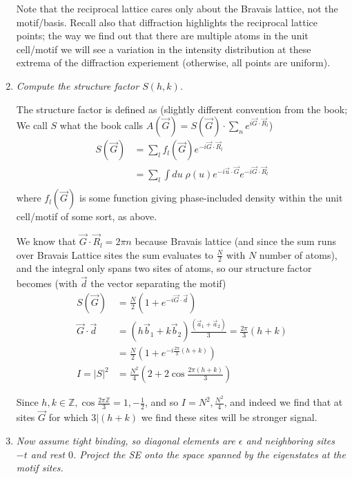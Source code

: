 \documentclass[10pt]{report}
\newcommand{\abs}[1]{\left|#1\right|}
\begin{document}
\begin{enumerate}[1.]
        Note that the reciprocal lattice cares only about the Bravais lattice, not the motif/basis. Recall also that diffraction highlights the reciprocal lattice points; the way we find out that there are multiple atoms in the unit cell/motif we will see a variation in the intensity distribution at these extrema of the diffraction experiement (otherwise, all points are uniform). 

    \item \emph{Compute the structure factor $S(h,k)$.}

        The structure factor is defined as (slightly different convention from the book; We call $S$ what the book calls $A(\vec{G}) = S(\vec{G}) \cdot \sum\limits_{n}^{}e^{i\vec{G} \cdot \vec{R}_l}$)
        \begin{align}
            S(\vec{G}) &= \sum\limits_{l}^{}f_l(\vec{G}) e^{-i\vec{G}\cdot \vec{R}_l}\\
            &= \sum\limits_{l}^{}\int\limits_{}^{}du\;\rho(u)e^{-i\vec{u} \cdot \vec{G}}e^{-i\vec{G} \cdot \vec{R}_l}
        \end{align}
        where $f_l(\vec{G})$ is some function giving phase-included density within the unit cell/motif of some sort, as above.

        We know that $\vec{G} \cdot \vec{R}_l = 2\pi n$ because Bravais lattice (and since the sum runs over Bravais Lattice sites the sum evaluates to $\frac{N}{2}$ with $N$ number of atoms), and the integral only spans two sites of atoms, so our structure factor becomes (with $\vec{d}$ the vector separating the motif)
        \begin{align}
            S(\vec{G}) &= \frac{N}{2}\left( 1 + e^{-i \vec{G} \cdot \vec{d}} \right)\\
            \vec{G} \cdot \vec{d} &= \left( h\vec{b}_1 + k\vec{b}_2 \right) \frac{\left( \vec{a}_1 + \vec{a}_2 \right)}{3} = \frac{2\pi}{3}\left( h + k \right)\\
            &= \frac{N}{2}\left( 1 + e^{-i\frac{2\pi}{3}\left( h + k \right)} \right)\\
            I = \abs{S}^2 &= \frac{N^2}{4}\left( 2 + 2\cos \frac{2\pi(h+k)}{3} \right)
        \end{align}

        Since $h,k\in\mathbb{Z}, \cos \frac{2\pi \mathbb{Z}}{3} = 1,-\frac{1}{2}$, and so $I = N^2, \frac{N^2}{4}$, and indeed we find that at sites $\vec{G}$ for which $3 | (h+k)$ we find these sites will be stronger signal.

    \item \emph{Now assume tight binding, so diagonal elements are $\epsilon$ and neighboring sites $-t$ and rest $0$. Project the SE onto the space spanned by the eigenstates at the motif sites.}


\end{enumerate}
\end{document}
